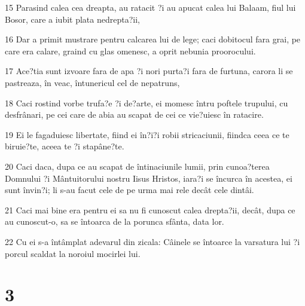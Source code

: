 \par 15 Parasind calea cea dreapta, au ratacit ?i au apucat calea lui Balaam, fiul lui Bosor, care a iubit plata nedrepta?ii,
\par 16 Dar a primit mustrare pentru calcarea lui de lege; caci dobitocul fara grai, pe care era calare, graind cu glas omenesc, a oprit nebunia proorocului.
\par 17 Ace?tia sunt izvoare fara de apa ?i nori purta?i fara de furtuna, carora li se pastreaza, în veac, întunericul cel de nepatruns,
\par 18 Caci rostind vorbe trufa?e ?i de?arte, ei momesc întru poftele trupului, cu desfrânari, pe cei care de abia au scapat de cei ce vie?uiesc în ratacire.
\par 19 Ei le fagaduiesc libertate, fiind ei în?i?i robii stricaciunii, fiindca ceea ce te biruie?te, aceea te ?i stapâne?te.
\par 20 Caci daca, dupa ce au scapat de întinaciunile lumii, prin cunoa?terea Domnului ?i Mântuitorului nostru Iisus Hristos, iara?i se încurca în acestea, ei sunt învin?i; li s-au facut cele de pe urma mai rele decât cele dintâi.
\par 21 Caci mai bine era pentru ei sa nu fi cunoscut calea drepta?ii, decât, dupa ce au cunoscut-o, sa se întoarca de la porunca sfânta, data lor.
\par 22 Cu ei s-a întâmplat adevarul din zicala: Câinele se întoarce la varsatura lui ?i porcul scaldat la noroiul mocirlei lui.

\chapter{3}

